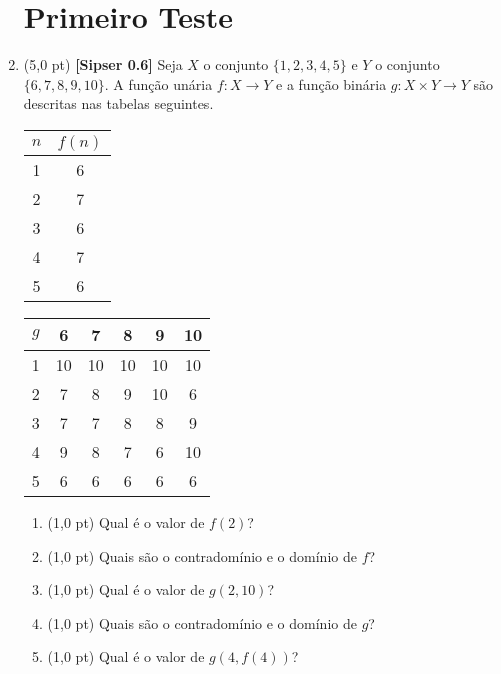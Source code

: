 \documentclass[12pt,a4paper,oneside]{article}
\begin{document}
\begin{enumerate}
	
	\section*{Primeiro Teste}
	
	\item (5,0 pt) {\bf [Sipser 0.6]} Seja $X$ o conjunto $\{1,2,3,4,5\}$ e $Y$ o conjunto $\{6,7,8,9,10\}$. A função unária
	$f : X \rightarrow Y$ e a função binária $g: X \times Y \rightarrow Y$ são descritas nas tabelas seguintes.
	
	\begin{multicols}{2}
		
		\begin{tabular}{c|c}
			$n$	&	$f(n)$	\\
			\hline
			1 	&	6	\\			
			2 	&	7	\\
			3 	&	6	\\
			4 	&	7	\\
			5 	&	6	\\
			\hline
		\end{tabular}
	
		\columnbreak
		
		\begin{tabular}{c|ccccc}
			$g$	& 	6	& 	7	& 	8	& 	9	&	10 \\
			\hline
			1	&	10	&	10	&	10	&	10	&	10 \\
			2	& 	7	& 	8	& 	9	& 	10	& 	6 \\	
			3	& 	7	& 	7	& 	8	& 	8	& 	9 \\
			4	& 	9	& 	8	& 	7	& 	6	& 	10 \\
			5	& 	6	& 	6	& 	6	& 	6	& 	6 \\
			\hline
		\end{tabular}
	
	\end{multicols}
	
	\begin{enumerate}
		\item (1,0 pt) Qual é o valor de $f(2)$?
		\item (1,0 pt) Quais são o contradomínio e o domínio de $f$?
		\item (1,0 pt) Qual é o valor de $g(2,10)$?
		\item (1,0 pt) Quais são o contradomínio e o domínio de $g$?
		\item (1,0 pt) Qual é o valor de $g(4,f(4))$?
	\end{enumerate}
	

\end{enumerate}
\end{document}

